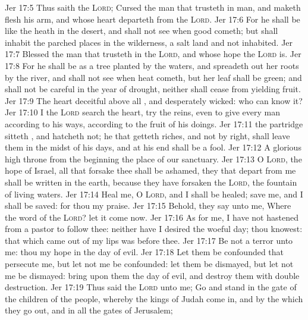 \vs Jer 17:5 Thus saith the \textsc{Lord}; Cursed  the man that trusteth in man, and maketh flesh his arm, and whose heart departeth from the \textsc{Lord}.
\vs Jer 17:6 For he shall be like the heath in the desert, and shall not see when good cometh; but shall inhabit the parched places in the wilderness,  a salt land and not inhabited.
\vs Jer 17:7 Blessed  the man that trusteth in the \textsc{Lord}, and whose hope the \textsc{Lord} is.
\vs Jer 17:8 For he shall be as a tree planted by the waters, and  spreadeth out her roots by the river, and shall not see when heat cometh, but her leaf shall be green; and shall not be careful in the year of drought, neither shall cease from yielding fruit.
\vs Jer 17:9 The heart  deceitful above all , and desperately wicked: who can know it?
\vs Jer 17:10 I the \textsc{Lord} search the heart,  try the reins, even to give every man according to his ways,  according to the fruit of his doings.
\vs Jer 17:11  the partridge sitteth , and hatcheth  not;  he that getteth riches, and not by right, shall leave them in the midst of his days, and at his end shall be a fool.
\vs Jer 17:12 A glorious high throne from the beginning  the place of our sanctuary.
\vs Jer 17:13 O \textsc{Lord}, the hope of Israel, all that forsake thee shall be ashamed,  they that depart from me shall be written in the earth, because they have forsaken the \textsc{Lord}, the fountain of living waters.
\vs Jer 17:14 Heal me, O \textsc{Lord}, and I shall be healed; save me, and I shall be saved: for thou  my praise.
\vs Jer 17:15 Behold, they say unto me, Where  the word of the \textsc{Lord}? let it come now.
\vs Jer 17:16 As for me, I have not hastened from  a pastor to follow thee: neither have I desired the woeful day; thou knowest: that which came out of my lips was  before thee.
\vs Jer 17:17 Be not a terror unto me: thou  my hope in the day of evil.
\vs Jer 17:18 Let them be confounded that persecute me, but let not me be confounded: let them be dismayed, but let not me be dismayed: bring upon them the day of evil, and destroy them with double destruction.
\vs Jer 17:19 Thus said the \textsc{Lord} unto me; Go and stand in the gate of the children of the people, whereby the kings of Judah come in, and by the which they go out, and in all the gates of Jerusalem;

